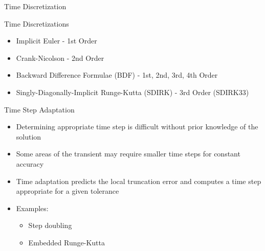 \documentclass[8pt,xcolor=dvipnames]{beamer}
\begin{document}
\begin{frame}{Time Discretization}
\vspace{-3mm}

\begin{block}{Time Discretizations}
\begin{itemize}
\item Implicit Euler - 1st Order
\item Crank-Nicolson - 2nd Order
\item Backward Difference Formulae (BDF) - 1st, 2nd, 3rd, 4th Order
\item Singly-Diagonally-Implicit Runge-Kutta (SDIRK) - 3rd Order (SDIRK33)
\end{itemize}
\end{block}

\begin{block}{Time Step Adaptation}
\begin{itemize}
\item Determining appropriate time step is difficult without prior knowledge of the solution
\item Some areas of the transient may require smaller time steps for constant accuracy
\item Time adaptation predicts the local truncation error and computes a time step appropriate for a given tolerance
\item Examples:
\begin{itemize}
\item Step doubling
\item Embedded Runge-Kutta
\end{itemize}
\end{itemize}
\end{block}

\end{frame}
\end{document}
